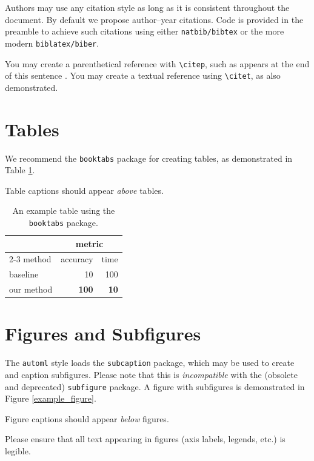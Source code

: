 \documentclass[11pt]{article}
\begin{document}
Authors may use any citation style as long as it is consistent throughout the
document. By default we propose author--year citations. Code is provided in the
preamble to achieve such citations using either \texttt{natbib/bibtex} or the
more modern \texttt{biblatex/biber}.

You may create a parenthetical reference with \verb|\citep|, such as appears at
the end of this sentence \citep{example_book}.  You may create a textual
reference using \verb|\citet|, as \citet{example_book} also demonstrated.

\section{Tables}

We recommend the \texttt{booktabs} package for creating tables, as demonstrated
in Table \ref{example_table}.

Table captions should appear \emph{above} tables.

\begin{table}
  \caption{An example table using the \texttt{booktabs} package.}
  \label{example_table}
  \centering
  \begin{tabular}{lrr}
    \toprule
    & \multicolumn{2}{c}{metric} \\
    \cmidrule{2-3}
    method & accuracy & time \\
    \midrule
    baseline & 10 & 100 \\
    our method & \textbf{100} & \textbf{10} \\
    \bottomrule
  \end{tabular}
\end{table}

\section{Figures and Subfigures}

The \texttt{automl} style loads the \texttt{subcaption} package, which may be
used to create and caption subfigures. Please note that this is
\emph{incompatible} with the (obsolete and deprecated) \texttt{subfigure}
package. A figure with subfigures is demonstrated in Figure
\ref{example_figure}.

Figure captions should appear \emph{below} figures.

Please ensure that all text appearing in figures (axis labels, legends, etc.)
is legible.
\end{document}
